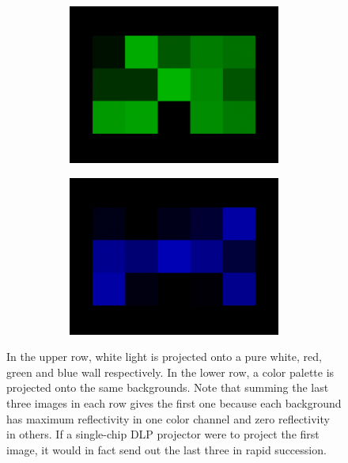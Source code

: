 \begin{figure}[ht]
\begin{subfigure}{\textwidth}
\begin{subfigure}{0.24\textwidth}
            \centering
            \includegraphics[width=\textwidth]{images/02-spd_intuition-palette_green.png}
            \caption*{}
            \label{fig:background_spd_intuition-palette_green}
        \end{subfigure}
        \hfill
        \begin{subfigure}{0.24\textwidth}
            \centering
            \includegraphics[width=\textwidth]{images/02-spd_intuition-palette_blue.png}
            \caption*{}
            \label{fig:background_spd_intuition-palette_blue}
        \end{subfigure}
    \end{subfigure}
    \caption{In the upper row, white light is projected onto a pure white, red, green and blue wall respectively. In the lower row, a color palette is projected onto the same backgrounds. Note that summing the last three images in each row gives the first one because each background has maximum reflectivity in one color channel and zero reflectivity in others. If a single-chip DLP projector were to project the first image, it would in fact send out the last three in rapid succession.}
    \label{fig:background_spd_intuition}
\end{figure}

